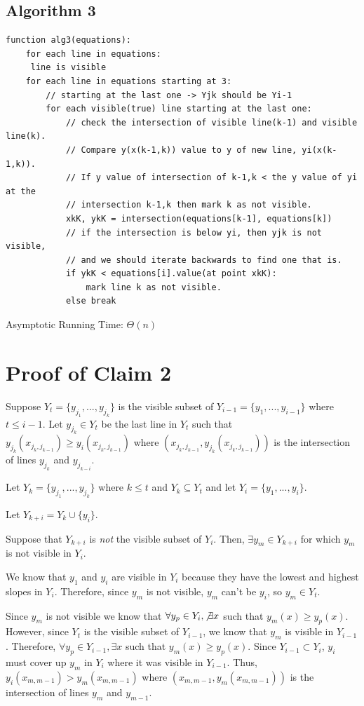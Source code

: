 \documentclass[12pt,letterpaper]{article}
\begin{document}
\subsection{Algorithm 3}
\begin{verbatim}
function alg3(equations):
	for each line in equations:
	 line is visible
    for each line in equations starting at 3:
        // starting at the last one -> Yjk should be Yi-1
        for each visible(true) line starting at the last one:
            // check the intersection of visible line(k-1) and visible line(k). 
            // Compare y(x(k-1,k)) value to y of new line, yi(x(k-1,k)). 
            // If y value of intersection of k-1,k < the y value of yi at the 
            // intersection k-1,k then mark k as not visible.
            xkK, ykK = intersection(equations[k-1], equations[k])
            // if the intersection is below yi, then yjk is not visible,
            // and we should iterate backwards to find one that is.
            if ykK < equations[i].value(at point xkK):
                mark line k as not visible.
            else break
\end{verbatim}

Asymptotic Running Time: $\Theta(n)$

\section{Proof of Claim 2}

Suppose $Y_t = \{ y_{j_1}, ..., y_{j_k} \}$ is the visible subset of $Y_{i-1} = \{ y_1, ..., y_{i-1} \}$ where $t \leq i - 1$. Let $y_{j_k} \in Y_t$ be the last line in $Y_t$ such that $y_{j_k}(x_{j_k, j_{k-1}}) \geq y_i(x_{j_k, j_{k-1}})$ where $(x_{j_k, j_{k-1}}, y_{j_k}(x_{j_k, j_{k-1}}))$ is the intersection of lines $y_{j_k}$ and $y_{j_{k-i}}$. 

Let $Y_k = \{ y_{j_1}, ..., y_{j_k} \}$ where $k \leq t$ and $Y_k \subseteq Y_t$ and let $Y_i = \{ y_1, ..., y_i \}$. 

Let $Y_{k+i} = Y_k \cup \{ y_i \}$.

Suppose that $Y_{k+i}$ is \textit{not} the visible subset of $Y_i$. Then, $\exists y_m \in Y_{k+i}$ for which $y_m$ is not visible in $Y_i$. 

We know that $y_1$ and $y_i$ are visible in $Y_i$ because they have the lowest and highest slopes in $Y_i$. Therefore, since $y_m$ is not visible, $y_m$ can't be $y_i$, so $y_m \in Y_t$.

Since $y_m$ is not visible we know that $\forall y_p \in Y_i, \not\exists x$ such that $y_m(x) \geq y_p(x)$. However, since $Y_t$ is the visible subset of $Y_{i-1}$, we know that $y_m$ is visible in $Y_{i-1}$. Therefore, $\forall y_p \in Y_{i-1}, \exists x$ such that $y_m(x) \geq y_p(x)$. Since $Y_{i-1} \subset Y_{i}$, $y_i$ must cover up $y_m$ in $Y_i$ where it was visible in $Y_{i-1}$. Thus, $y_i(x_{m, m-1}) > y_m(x_{m, m-1})$ where $(x_{m, m-1}, y_m(x_{m, m-1}))$ is the intersection of lines $y_m$ and $y_{m-1}$.
\end{document}
